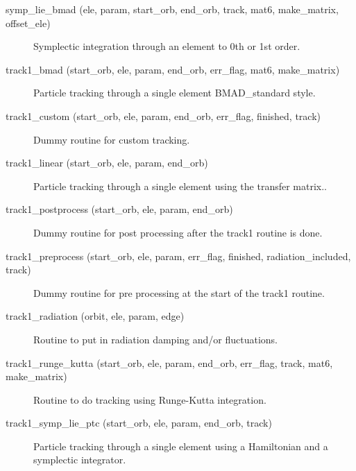 \begin{description}

\label{r:symp.lie.bmad}
\item[symp_lie_bmad (ele, param, start_orb, end_orb, track, mat6, make_matrix, offset_ele)] \Newline
Symplectic integration through an element to 0th or 1st order.

\label{r:track1.bmad}
\item[track1_bmad (start_orb, ele, param, end_orb, err_flag, mat6, make_matrix)] \Newline
Particle tracking through a single element BMAD_standard style. 

\item[track1_custom (start_orb, ele, param, end_orb, err_flag, finished, track)] \Newline
Dummy routine for custom tracking.

\label{r:track1.linear}
\item[track1_linear (start_orb, ele, param, end_orb)] \Newline
Particle tracking through a single element using the transfer matrix.. 

\item[track1_postprocess (start_orb, ele, param, end_orb)] \Newline 
Dummy routine for post processing after the track1 routine is done.

\item[track1_preprocess (start_orb, ele, param, err_flag, finished, radiation_included, track)] \Newline 
Dummy routine for pre processing at the start of the track1 routine.

\label{r:track1.radiation}
\item[track1_radiation (orbit, ele, param, edge)] \Newline
Routine to put in radiation damping and/or fluctuations. 

\label{r:track1.runge.kutta}
\item[track1_runge_kutta (start_orb, ele, param, end_orb, err_flag, track, mat6, make_matrix)] \Newline
Routine to do tracking using Runge-Kutta integration. 

\label{r:track1.symp.lie.ptc}
\item[track1_symp_lie_ptc (start_orb, ele, param, end_orb, track)] \Newline
Particle tracking through a single element using a Hamiltonian and a 
symplectic integrator. 


\end{description}
